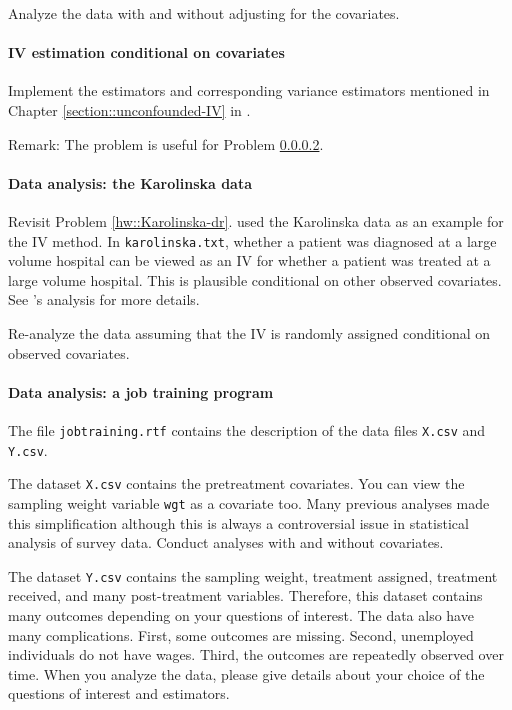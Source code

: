 Analyze the data with and without adjusting for the covariates. 
 


\paragraph{IV estimation conditional on covariates}\label{hw::iv-conditional-x}

Implement the estimators and corresponding variance estimators mentioned in Chapter \ref{section::unconfounded-IV} in . 

Remark: The problem is useful for Problem \ref{hw::analyze-karolinska-iv}. 



\paragraph{Data analysis: the Karolinska data}\label{hw::analyze-karolinska-iv}

Revisit Problem \ref{hw::Karolinska-dr}. 
\citet{rubin2008objective} used the Karolinska data as an example for the IV method. In \texttt{karolinska.txt}, whether a patient was diagnosed at a large volume hospital can be viewed as an IV for whether a patient was treated at a large volume hospital. This is plausible conditional on other observed covariates. See \citet{rubin2008objective}'s analysis for more details. 


Re-analyze the data assuming that the IV is randomly assigned conditional on observed covariates. 

 
 
 \paragraph{Data analysis: a job training program}

The file \texttt{jobtraining.rtf} contains the description of the data files \texttt{X.csv} and \texttt{Y.csv}. 

The dataset \texttt{X.csv} contains the pretreatment covariates. You can view the sampling weight variable \texttt{wgt} as a covariate too. Many previous analyses made this simplification although this is always a controversial issue in statistical analysis of survey data. 
Conduct analyses with and without covariates. 

The dataset \texttt{Y.csv} contains the sampling weight, treatment assigned, treatment received, and many post-treatment variables. Therefore, this dataset contains many outcomes depending on your questions of interest. The data also have many complications. First, some outcomes are missing. Second, unemployed individuals do not have wages. Third, the outcomes are repeatedly observed over time. When you analyze the data, please give details about your choice of the questions of interest and estimators. 

